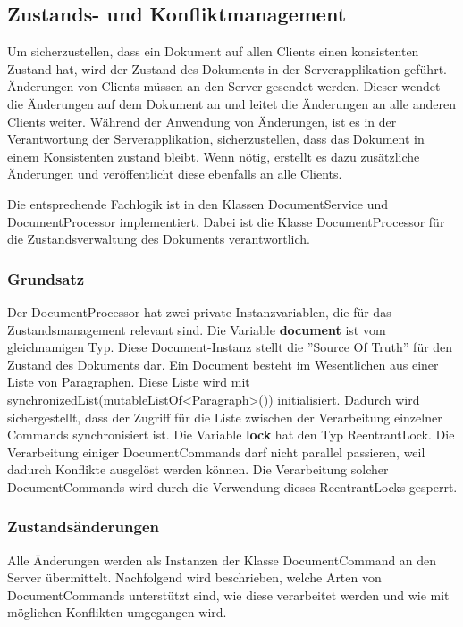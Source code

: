 \clearpage

\subsection{Zustands- und Konfliktmanagement}\label{subsec:statemgmt}

Um sicherzustellen, dass ein Dokument auf allen Clients einen konsistenten Zustand hat, wird der Zustand des Dokuments in der Serverapplikation geführt.
Änderungen von Clients müssen an den Server gesendet werden.
Dieser wendet die Änderungen auf dem Dokument an und leitet die Änderungen an alle anderen Clients weiter.
Während der Anwendung von Änderungen, ist es in der Verantwortung der Serverapplikation, sicherzustellen, dass das Dokument in einem Konsistenten zustand bleibt.
Wenn nötig, erstellt es dazu zusätzliche Änderungen und veröffentlicht diese ebenfalls an alle Clients.

Die entsprechende Fachlogik ist in den Klassen DocumentService und DocumentProcessor implementiert.
Dabei ist die Klasse DocumentProcessor für die Zustandsverwaltung des Dokuments verantwortlich.


\subsubsection{Grundsatz}

Der DocumentProcessor hat zwei private Instanzvariablen, die für das Zustandsmanagement relevant sind.
Die Variable \textbf{document} ist vom gleichnamigen Typ.
Diese Document-Instanz stellt die ''Source Of Truth'' für den Zustand des Dokuments dar.
Ein Document besteht im Wesentlichen aus einer Liste von Paragraphen.
Diese Liste wird mit synchronizedList(mutableListOf<Paragraph>()) initialisiert.
Dadurch wird sichergestellt, dass der Zugriff für die Liste zwischen der Verarbeitung einzelner Commands synchronisiert ist.
Die Variable \textbf{lock} hat den Typ ReentrantLock.
Die Verarbeitung einiger DocumentCommands darf nicht parallel passieren, weil dadurch Konflikte ausgelöst werden können.
Die Verarbeitung solcher DocumentCommands wird durch die Verwendung dieses ReentrantLocks gesperrt.

\subsubsection{Zustandsänderungen}

Alle Änderungen werden als Instanzen der Klasse DocumentCommand an den Server übermittelt.
Nachfolgend wird beschrieben, welche Arten von DocumentCommands unterstützt sind, wie diese verarbeitet werden und wie mit möglichen Konflikten umgegangen wird.


